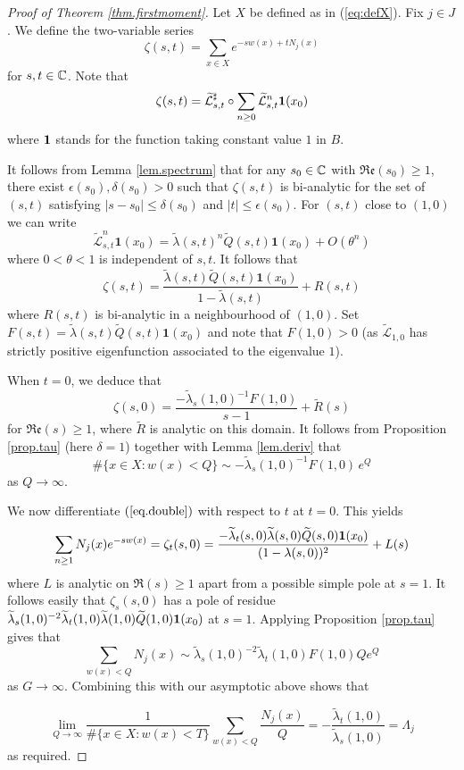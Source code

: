 \documentclass[12pt,a4paper,reqno]{amsart}
\begin{document}
\begin{proof}[Proof of Theorem \ref{thm.firstmoment}]
Let $X$  be defined as in (\ref{eq:defX}). Fix $
j \in J$.
We define the two-variable series
\[
\zeta(s,t) = \sum_{x \in X} e^{-sw(x) + t  N_j(x)}
\]
for $s,t\in {\mathbb C}$.
Note that
\[
\zeta(s,t) = \widetilde{\mathcal{L}}_{s,t}^\sharp \circ \sum_{n\ge 0} \widetilde{\mathcal{L}}_{s ,t}^n {\bf 1}(x_0)
\]
where $ {\bf 1}$ stands for the  function taking constant value $1$ in $B$.

It follows from Lemma \ref{lem.spectrum} that for any $s_0 \in {\mathbb C}$ with  $\mathfrak{Re}(s_0) \ge 1$,  there exist $\epsilon(s_0), \delta(s_0) > 0$ such that $\zeta(s,t)$ is bi-analytic  for  the set of  $(s,t)$ satisfying  $|s-s_0|\le \delta(s_0)$ and $|t| \le \epsilon(s_0)$.  For $(s,t)$ close to $(1,0)$ we can write 
\[
\widetilde{\mathcal{L}}_{s,t}^n\textbf{1}(x_0) = \widetilde{\lambda}(s,t)^n \widetilde{Q}(s,t)\textbf{1}(x_0) + O(\theta^n)
\]
where $0 < \theta < 1$ is independent of $s,t$.
 It follows that
\begin{equation} \label{eq.double}
\zeta(s,t) = \frac{ \widetilde{\lambda}(s ,t)\widetilde{Q}(s,t)\textbf{1}(x_0)}{1-\widetilde{\lambda}(s,t)} + R(s,t)
\end{equation}
where $R(s,t)$ is bi-analytic in a neighbourhood of $(1,0)$. Set $F(s,t) = \widetilde{\lambda}(s,t)\widetilde{Q}(s,t)\textbf{1}(x_0)$ and note that $F(1,0) > 0$ (as $\widetilde{\mathcal{L}}_{1,0}$ has strictly positive eigenfunction associated to the eigenvalue $1$). 

When $t =0$, we deduce that 
\[
\zeta(s,0) = \frac{  - \widetilde{\lambda}_s(1,0)^{-1} F(1,0)}{s-1} + \tilde{R}(s)
\]
for $\mathfrak{Re}(s) \ge 1$, where $\tilde{R}$ is analytic on this domain. It follows from Proposition \ref{prop.tau} (here $\delta=1$)  together with Lemma \ref{lem.deriv} that
\[
\#\{ x \in X : w(x) < Q\} \sim  -\widetilde{\lambda}_s(1,0)^{-1} F(1,0) \, e^{Q}
\]
as $Q \to \infty$.

We now differentiate $(\ref{eq.double})$ with respect to $t$ at $t=0$. This yields 
\[
\sum_{n \ge 1} N_j(x) e^{-sw(x)} = \zeta_t(s,0) = \frac{ - \widetilde{\lambda}_t(s,0)\widetilde{\lambda}(s,0)\widetilde{Q}(s,0){\bf 1}(x_0)}{(1-\lambda(s,0))^2} + L(s)
\]
where $L$ is analytic on $\mathfrak{R}(s)\ge 1$ apart from a possible simple pole at $s=1$. It follows easily that $\zeta_s(s,0)$ has a pole of residue $\widetilde{\lambda}_s(1,0)^{-2} \widetilde{\lambda}_t(1,0) \widetilde{\lambda}(1,0)\widetilde{Q}(1,0){\bf 1}(x_0)$ at $s=1$. Applying Proposition \ref{prop.tau} gives that
\[
\sum_{w(x) <Q} N_j(x) \sim \widetilde{\lambda}_s(1,0)^{-2} \widetilde{\lambda}_t(1,0) F(1,0) Q e^Q
\]
as $G\to\infty$. Combining this with our asymptotic above shows that

\[
\lim_{Q\to\infty} \frac{1}{\#\{ x \in X : w(x) < T\}}  \sum_{w(x) < Q} \frac{N_j(x)}{Q} = - \frac{\widetilde{\lambda}_t(1,0)}{\widetilde{\lambda}_s(1,0)} = \Lambda_j 
\]
 as required.
\end{proof}
\end{document}
